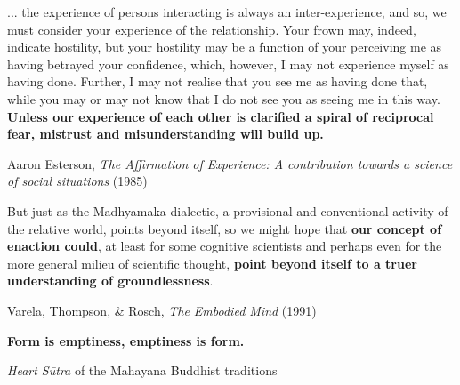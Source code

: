 \documentclass{article}
\begin{document}
\vspace{10px}

\begin{customquote}
    ... the experience of persons interacting is always an inter-experience, and so, we must consider your experience of the relationship. Your frown may, indeed, indicate hostility, but your hostility may be a function of your perceiving me as having betrayed your confidence, which, however, I may not experience myself as having done. Further, I may not realise that you see me as having done that, while you may or may not know that I do not see you as seeing me in this way. \textbf{Unless our experience of each other is clarified a spiral of reciprocal fear, mistrust and misunderstanding will build up.} \\
    \begin{center}
        Aaron Esterson, \emph{The Affirmation of Experience: A contribution towards a science of social situations} (1985) \cite{esterson1985}
    \end{center}
\end{customquote}

\vspace{10px}


\begin{customquote}
    But just as the Madhyamaka dialectic, a provisional and conventional activity of the relative world, points beyond itself, so we might hope that \textbf{our concept of enaction could}, at least for some cognitive scientists and perhaps even for the more general milieu of scientific thought, \textbf{point beyond itself to a truer understanding of groundlessness}.

    \begin{center}
        Varela, Thompson, \& Rosch, \emph{The Embodied Mind} (1991) \cite{varela1991}
    \end{center}
\end{customquote}

\vspace{10px} %

\begin{customquote}
    \textbf{Form is emptiness, emptiness is form.}\\

    \begin{center}
        \emph{Heart Sūtra} of the Mahayana Buddhist traditions
    \end{center}
\end{customquote}
\end{document}
